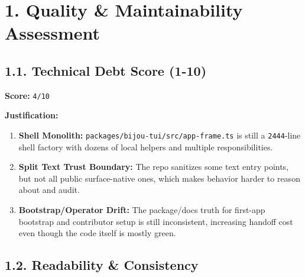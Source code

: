 \section{1. Quality \& Maintainability Assessment}\label{record-418-quality-maintainability-assessment}

\subsection{1.1. Technical Debt Score (1-10)}\label{record-418-technical-debt-score-1-10}

\textbf{Score:} \texttt{4\allowbreak{}/\allowbreak{}1\allowbreak{}0}

\textbf{Justification:}

\begin{enumerate}
\def\labelenumi{\arabic{enumi}.}
\tightlist
\item
  \textbf{Shell Monolith:} \texttt{p\allowbreak{}a\allowbreak{}c\allowbreak{}k\allowbreak{}a\allowbreak{}g\allowbreak{}e\allowbreak{}s\allowbreak{}/\allowbreak{}b\allowbreak{}i\allowbreak{}j\allowbreak{}o\allowbreak{}u\allowbreak{}-\allowbreak{}t\allowbreak{}u\allowbreak{}i\allowbreak{}/\allowbreak{}s\allowbreak{}r\allowbreak{}c\allowbreak{}/\allowbreak{}a\allowbreak{}p\allowbreak{}p\allowbreak{}-\allowbreak{}f\allowbreak{}r\allowbreak{}a\allowbreak{}m\allowbreak{}e\allowbreak{}.\allowbreak{}t\allowbreak{}s} is still a \texttt{2\allowbreak{}4\allowbreak{}4\allowbreak{}4}-line shell factory with dozens of local helpers and multiple responsibilities.
\item
  \textbf{Split Text Trust Boundary:} The repo sanitizes some text entry points, but not all public surface-native ones, which makes behavior harder to reason about and audit.
\item
  \textbf{Bootstrap/Operator Drift:} The package/docs truth for first-app bootstrap and contributor setup is still inconsistent, increasing handoff cost even though the code itself is mostly green.
\end{enumerate}

\subsection{1.2. Readability \& Consistency}\label{record-418-readability-consistency}

